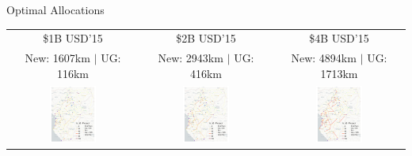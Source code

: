 \documentclass[aspectratio=169,xcolor=dvipsnames]{beamer}
\begin{document}
\begin{frame}[label=III]{Optimal Allocations \quad \hyperlink{EXP}{}}
\vspace{-1mm}
\begin{adjustbox}{center}
\begin{tabular}{@{}c@{}|@{}c@{}|@{}c@{}} 
\$1B USD'15 & \$2B USD'15 & \$4B USD'15 \\
New: 1607km $|$ UG: 116km & New: 2943km $|$ UG: 416km & New: 4894km $|$ UG: 1713km \\ 
\includegraphics[width=0.38\textwidth, trim= {0.9cm 0 0.9cm 0}, clip]{"../figures/GE/trans_africa_network_GE_add_20g_1b_fixed_cgc_sigma3.8_rho0_julia_MACR_90kmh_google_perc_ug.pdf"} & 
\includegraphics[width=0.38\textwidth, trim= {0.9cm 0 0.9cm 0}, clip]{"../figures/GE/trans_africa_network_GE_add_20g_2b_fixed_cgc_sigma3.8_rho0_julia_MACR_90kmh_google_perc_ug.pdf"} &
\includegraphics[width=0.38\textwidth, trim= {0.9cm 0 0.9cm 0}, clip]{"../figures/GE/trans_africa_network_GE_add_20g_4b_fixed_cgc_sigma3.8_rho0_julia_MACR_90kmh_google_perc_ug.pdf"}  
\end{tabular}
\end{adjustbox}
\end{frame}
\end{document}
